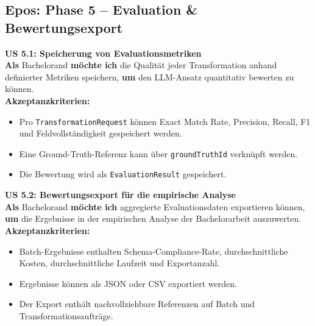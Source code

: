 \documentclass[11pt,a4paper]{article}
\begin{document}
\subsection{Epos: Phase 5 – Evaluation \& Bewertungsexport}

\noindent\colorbox{usgray}{%
\begin{minipage}{\dimexpr\textwidth-2\fboxsep\relax}
\textbf{\textcolor{usblue}{US 5.1: Speicherung von Evaluationsmetriken}} \\[0.5em]
\textbf{Als} Bachelorand \textbf{möchte ich} die Qualität jeder Transformation anhand definierter Metriken speichern, \textbf{um} den LLM-Ansatz quantitativ bewerten zu können.\\[0.5em]
\textbf{Akzeptanzkriterien:}
\begin{itemize}[leftmargin=*, parsep=0pt, topsep=0pt, itemsep=2pt]
    \item Pro \texttt{TransformationRequest} können Exact Match Rate, Precision, Recall, F1 und Feldvollständigkeit gespeichert werden.
    \item Eine Ground-Truth-Referenz kann über \texttt{groundTruthId} verknüpft werden.
    \item Die Bewertung wird als \texttt{EvaluationResult} gespeichert.
\end{itemize}
\end{minipage}}
\vspace{1em}

\noindent\colorbox{usgray}{%
\begin{minipage}{\dimexpr\textwidth-2\fboxsep\relax}
\textbf{\textcolor{usblue}{US 5.2: Bewertungsexport für die empirische Analyse}} \\[0.5em]
\textbf{Als} Bachelorand \textbf{möchte ich} aggregierte Evaluationsdaten exportieren können, \textbf{um} die Ergebnisse in der empirischen Analyse der Bachelorarbeit auszuwerten.\\[0.5em]
\textbf{Akzeptanzkriterien:}
\begin{itemize}[leftmargin=*, parsep=0pt, topsep=0pt, itemsep=2pt]
    \item Batch-Ergebnisse enthalten Schema-Compliance-Rate, durchschnittliche Kosten, durchschnittliche Laufzeit und Exportanzahl.
    \item Ergebnisse können als JSON oder CSV exportiert werden.
    \item Der Export enthält nachvollziehbare Referenzen auf Batch und Transformationsaufträge.
\end{itemize}
\end{minipage}}
\end{document}

